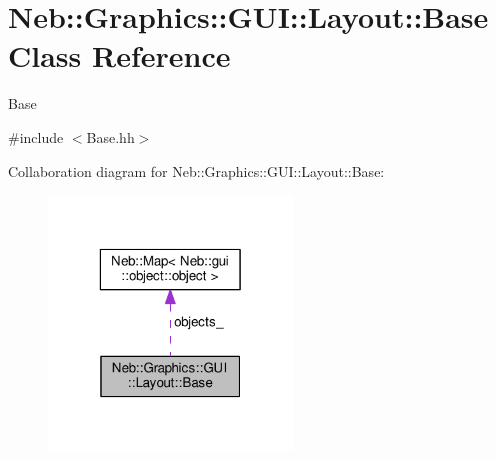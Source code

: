 \hypertarget{classNeb_1_1Graphics_1_1GUI_1_1Layout_1_1Base}{\section{Neb\-:\-:Graphics\-:\-:G\-U\-I\-:\-:Layout\-:\-:Base Class Reference}
\label{classNeb_1_1Graphics_1_1GUI_1_1Layout_1_1Base}
}


Base  




{\ttfamily \#include $<$Base.\-hh$>$}



Collaboration diagram for Neb\-:\-:Graphics\-:\-:G\-U\-I\-:\-:Layout\-:\-:Base\-:
\nopagebreak
\begin{figure}[H]
\begin{center}
\leavevmode
\includegraphics[width=184pt]{classNeb_1_1Graphics_1_1GUI_1_1Layout_1_1Base__coll__graph}
\end{center}
\end{figure}
